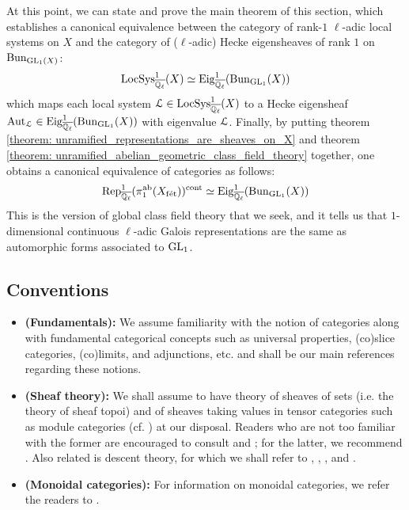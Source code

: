         At this point, we can state and prove the main theorem of this section, which establishes a canonical equivalence between the category of rank-$1$ $\ell$-adic local systems on $X$ and the category of ($\ell$-adic) Hecke eigensheaves of rank $1$ on $\mathrm{Bun}_{\operatorname{GL}_1(X)}$:
            $$\mathrm{LocSys}_{\overline{\mathbb{Q}_{\ell}}}^1(X) \simeq \mathrm{Eig}^1_{\overline{\mathbb{Q}_{\ell}}}(\mathrm{Bun}_{\operatorname{GL}_1}(X))$$
        which maps each local system $\mathcal{L} \in \mathrm{LocSys}_{\overline{\mathbb{Q}_{\ell}}}^1(X)$ to a Hecke eigensheaf $\mathrm{Aut}_{\mathcal{L}} \in \mathrm{Eig}^1_{\overline{\mathbb{Q}_{\ell}}}(\mathrm{Bun}_{\operatorname{GL}_1}(X))$ with eigenvalue $\mathcal{L}$. Finally, by putting theorem \ref{theorem: unramified_representations_are_sheaves_on_X} and theorem \ref{theorem: unramified_abelian_geometric_class_field_theory} together, one obtains a canonical equivalence of categories as follows:
            $$\mathrm{Rep}_{\overline{\mathbb{Q}_{\ell}}}^1(\pi_1^{\mathrm{ab}}(X_{\mathrm{f\acute{e}t}}))^{\mathrm{cont}} \simeq \mathrm{Eig}^1_{\overline{\mathbb{Q}_{\ell}}}(\mathrm{Bun}_{\operatorname{GL}_1}(X))$$
        This is the version of global class field theory that we seek, and it tells us that $1$-dimensional continuous $\ell$-adic Galois representations are the same as automorphic forms associated to $\operatorname{GL}_1$.
        
    \subsection{Conventions}
        \begin{convention} \label{conv: category_theory}
            \noindent
            \begin{itemize}
                \item \textbf{(Fundamentals):} We assume familiarity with the notion of categories along with fundamental categorical concepts such as universal properties, (co)slice categories, (co)limits, and adjunctions, etc. \cite{maclane} and \cite[\href{https://stacks.math.columbia.edu/tag/0011}{Tag 0011}]{stacks} shall be our main references regarding these notions.
                \item \textbf{(Sheaf theory):} We shall assume to have theory of sheaves of sets (i.e. the theory of sheaf topoi) and of sheaves taking values in tensor categories such as module categories (cf. \cite{EGNO}) at our disposal. Readers who are not too familiar with the former are encouraged to consult \cite{sga4} and \cite[\href{https://stacks.math.columbia.edu/tag/00UZ}{Tag 00UZ}]{stacks}; for the latter, we recommend \cite[\href{https://stacks.math.columbia.edu/tag/006A}{Tag 006A}, \href{https://stacks.math.columbia.edu/tag/01AC}{Tag 01AC}, and \href{https://stacks.math.columbia.edu/tag/03A4}{Tag 03A4}]{stacks}. Also related is descent theory, for which we shall refer to \cite{vistoli_descent}, \cite[section C2.1]{elephant1}, \cite[Chapter III]{sheaves_in_geometry_and_logic}, and \cite[\href{https://stacks.math.columbia.edu/tag/0266}{Tag 0266} and \href{https://stacks.math.columbia.edu/tag/0238}{Tag 0238}]{stacks}.
                \item \textbf{(Monoidal categories):} For information on monoidal categories, we refer the readers to \cite{EGNO}.
            \end{itemize}
        \end{convention}
        
